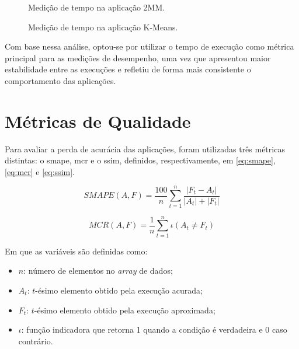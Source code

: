 \begin{figure}[htbp]
	\centering
	\hfill
	\caption{Medição de tempo na aplicação 2MM.}
	\label{fig:2mm_time}
\end{figure}

\begin{figure}[htbp]
	\centering
	\hfill
	\caption{Medição de tempo na aplicação K-Means.}
	\label{fig:kmeans_time}
\end{figure}

Com base nessa análise, optou-se por utilizar o tempo de execução como métrica principal para as medições de desempenho, uma vez que apresentou maior estabilidade entre as execuções e refletiu de forma mais consistente o comportamento das aplicações.

\section{Métricas de Qualidade}\label{sec:qualidade}

Para avaliar a perda de acurácia das aplicações, foram utilizadas três métricas distintas: o \gls{smape}, \gls{mcr} e o \gls{ssim}, definidos, respectivamente, em \autoref{eq:smape}, \autoref{eq:mcr} e \autoref{eq:ssim}.

\begin{equation}
	SMAPE(A, F) = \frac{100}{n} \sum^{n}_{t=1}\frac{|F_t - A_t|}{|A_t| + |F_t|}
	\label{eq:smape}
\end{equation}

\begin{equation}
	MCR(A, F) = \frac{1}{n} \sum^{n}_{t=1} \iota (A_t \neq F_t)
	\label{eq:mcr}
\end{equation}

Em que as variáveis são definidas como:
\begin{itemize}
	\item $n$: número de elementos no \textit{array} de dados;
	\item $A_t$: $t$-ésimo elemento obtido pela execução acurada;
	\item $F_t$: $t$-ésimo elemento obtido pela execução aproximada;
	\item $\iota$: função indicadora que retorna 1 quando a condição é verdadeira e 0 caso contrário.
\end{itemize}

